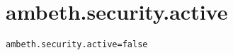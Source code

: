 \section{ambeth.security.active}
\label{configuration:AmbethSecurityActive}
\ClearAPI
\TODO
{}
\begin{lstlisting}[style=Props,caption={Usage example for \textit{ambeth.security.active}}]
ambeth.security.active=false
\end{lstlisting}